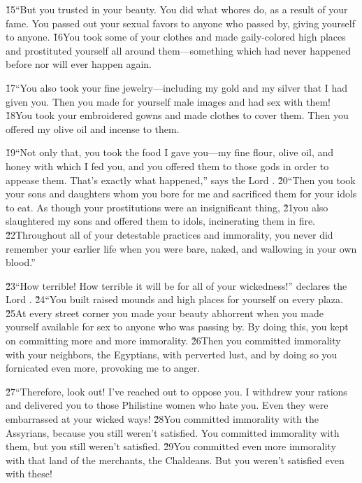 \v{15}``But you trusted in your beauty. You did what whores do, as a result of your fame. You passed out your sexual favors to anyone who passed by, giving yourself to anyone. \v{16}You took some of your clothes and made gaily-colored high places and prostituted yourself all around them---something which had never happened before nor will ever happen again.

\v{17}``You also took your fine jewelry---including my gold and my silver that I had given you. Then you made for yourself male images and had sex with them! \v{18}You took your embroidered gowns and made clothes to cover them. Then you offered my olive oil and incense to them.

\v{19}``Not only that, you took the food I gave you---my fine flour, olive oil, and honey with which I fed you, and you offered them to those gods in order to appease them. That's exactly what happened,'' says the Lord . \v{20}``Then you took your sons and daughters whom you bore for me and sacrificed them for your idols to eat. As though your prostitutions were an insignificant thing, \v{21}you also slaughtered my sons and offered them to idols, incinerating them in fire. \v{22}Throughout all of your detestable practices and immorality, you never did remember your earlier life when you were bare, naked, and wallowing in your own blood.''

\v{23}``How terrible! How terrible it will be for all of your wickedness!'' declares the Lord . \v{24}``You built raised mounds and high places for yourself on every plaza. \v{25}At every street corner you made your beauty abhorrent when you made yourself available for sex to anyone who was passing by. By doing this, you kept on committing more and more immorality. \v{26}Then you committed immorality with your neighbors, the Egyptians, with perverted lust, and by doing so you fornicated even more, provoking me to anger.

\v{27}``Therefore, look out! I've reached out to oppose you. I withdrew your rations and delivered you to those Philistine women who hate you. Even they were embarrassed at your wicked ways! \v{28}You committed immorality with the Assyrians, because you still weren't satisfied. You committed immorality with them, but you still weren't satisfied. \v{29}You committed even more immorality with that land of the merchants, the Chaldeans. But you weren't satisfied even with these!

